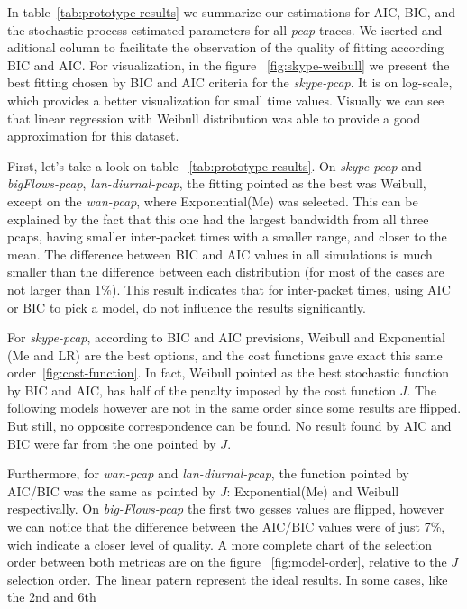 In table~\ref{tab:prototype-results} we summarize our estimations for AIC, BIC, and the stochastic process estimated parameters for all \textit{pcap} traces. We iserted and aditional column to facilitate the observation of the quality of fitting according BIC and AIC. For visualization, in the figure ~\ref{fig:skype-weibull} we present the best fitting chosen by BIC and AIC criteria for the \textit{skype-pcap}. It is on log-scale, which provides a better visualization for small time values. Visually we can see that linear regression with Weibull distribution was able to provide a good approximation for this dataset.

First, let's take a look on table ~\ref{tab:prototype-results}. On \textit{skype-pcap} and \textit{bigFlows-pcap}, \textit{lan-diurnal-pcap}, the fitting pointed as the best was Weibull, except on the \textit{wan-pcap}, where Exponential(Me) was selected. This can be explained by the fact that this one had the largest bandwidth from all three pcaps, having smaller inter-packet times with a smaller range, and closer to the mean. The difference between BIC and AIC values in all simulations is much smaller than the difference between each distribution (for most of the cases are not larger than 1\%). This result indicates that for inter-packet times, using AIC or BIC to pick a model, do not influence the results significantly.


For \textit{skype-pcap}, according to BIC and AIC previsions, Weibull and Exponential (Me and LR) are the best options, and the cost functions gave exact this same order~\ref{fig:cost-function}. In fact, Weibull pointed as the best stochastic function by BIC and AIC, has half of the penalty imposed by the cost function $J$. The following models however are not in the same order since some results are flipped. But still, no opposite correspondence can be found. No result found by AIC and BIC were far from the one pointed by $J$.  


Furthermore, for \textit{wan-pcap} and \textit{lan-diurnal-pcap}, the function pointed by AIC/BIC was the same as pointed by $J$: Exponential(Me) and Weibull respectivally. On \textit{big-Flows-pcap} the first two gesses values are flipped, however we can notice that the difference between the AIC/BIC values were of just 7\%, wich indicate a closer level of quality. A more complete chart of the selection order between both metricas are on the figure ~\ref{fig:model-order}, relative to the $J$ selection order. The linear patern represent the ideal results. In some cases, like the 2nd and 6th


